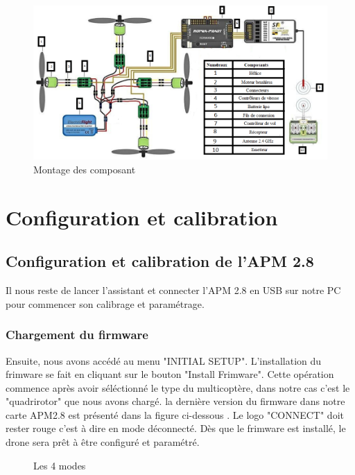 \documentclass[a4paper,12pt]{book}
\begin{document}
	\begin{figure} [h]
	\begin{center}
		\centering
	\hspace*{-1cm}\includegraphics[width=1.1\linewidth]{Images/Shéma électrique}
	\end{center}
	\caption{Montage des composant}
\end{figure}


\section{Configuration et calibration}
\subsection{Configuration et calibration de l'APM 2.8}
Il nous reste  de lancer l’assistant et connecter l'APM 2.8 en USB sur notre PC pour commencer son calibrage et paramétrage. 
\subsubsection{Chargement du firmware }
Ensuite, nous avons accédé au menu "INITIAL SETUP". L'installation du frimware se fait en cliquant sur le bouton "Install Frimware". Cette opération commence après avoir séléctionné le type du multicoptère, dans notre cas c'est le "quadrirotor" que nous avons chargé.  la dernière version du firmware dans
notre carte APM2.8 est présenté dans la figure ci-dessous . Le logo "CONNECT" doit rester rouge c'est à dire en mode déconnecté. Dès que le frimware est installé, le drone sera prêt à être configuré et paramétré.
\begin{figure}[h]
	\begin{center}
		\centering
	\end{center}
	\caption{Les 4 modes}
\end{figure}
\end{document}
